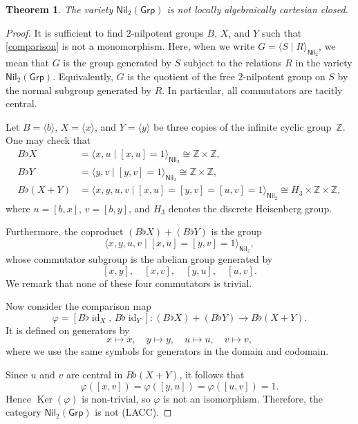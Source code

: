 \documentclass[reqno,hidelinks,a4paper]{amsart}
\theoremstyle{plain}
\newtheorem{theorem}[subsection]{Theorem}
\theoremstyle{definition}
\theoremstyle{remark}
\numberwithin{equation}{section}
\newcommand*{\CondName}[1]{{\rm (#1)}}
\newcommand*{\LACC}{\CondName{LACC}}
\newcommand{\Z}{\mathbb{Z}}
\DeclareMathOperator{\Ker}{Ker}
\DeclareMathOperator{\id}{id}
\newcommand{\Grp}{\ensuremath{\mathsf{Grp}}}
\newcommand{\Nil}{\ensuremath{\mathsf{Nil}}}
\begin{document}
\begin{theorem}
    The variety \(\Nil_2(\Grp)\) is not locally algebraically cartesian closed.
\end{theorem}

\begin{proof}
    It is sufficient to find \(2\)-nilpotent groups \(B\), \(X\), and \(Y\) such that \eqref{comparison} is not a monomorphism. Here, when we write \(G=\langle S \mid R \rangle_{\Nil_2}\), we mean that \(G\) is the group generated by \(S\)
    subject to the relations \(R\) in the variety \(\Nil_2(\Grp)\). Equivalently, \(G\) is the quotient of the free \(2\)-nilpotent group on \(S\) by the normal subgroup generated by \(R\). In
    particular, all commutators are tacitly central.

    Let \(B=\langle b\rangle\), \(X=\langle x\rangle\), and \(Y=\langle y\rangle\) be three copies of the infinite cyclic group~\(\Z\). One may check that
    \begin{align*}
        B \flat X     & = \langle x,u \mid [x,u]=1 \rangle_{\Nil_2} \cong \Z \times \Z,                           \\
        B \flat Y     & = \langle y,v \mid [y,v]=1 \rangle_{\Nil_2} \cong \Z \times \Z,                           \\
        B \flat (X+Y) & =\langle x,y,u,v \mid [x,u]=[y,v]=[u,v]=1 \rangle_{\Nil_2} \cong H_3 \times \Z \times \Z,
    \end{align*}
    where \(u=[b,x]\), \(v=[b,y]\), and \(H_3\) denotes the discrete Heisenberg group.

    Furthermore, the coproduct \((B \flat X) + (B \flat Y)\) is the group
    \[
        \langle x,y,u,v \mid [x,u]=[y,v]=1 \rangle_{\Nil_2},
    \]
    whose commutator subgroup is the abelian group generated by
    \[
        [x,y], \quad [x,v], \quad [y,u], \quad [u,v].
    \]
    We remark that none of these four commutators is trivial.

    Now consider the comparison map
    \[
        \varphi=[B \flat \id_X,\, B \flat \id_Y]\colon (B\flat X)+(B\flat Y)\to B\flat(X+Y).
    \]
    It is defined on generators by
    \[
        x \mapsto x,\quad y \mapsto y,\quad u \mapsto u,\quad v \mapsto v,
    \]
    where we use the same symbols for generators in the domain and codomain.

    Since \(u\) and \(v\) are central in \(B\flat (X+Y)\), it follows that
    \[
        \varphi([x,v])=\varphi([y,u])=\varphi([u,v])=1.
    \]
    Hence \(\Ker(\varphi)\) is non-trivial, so \(\varphi\) is not an isomorphism. Therefore, the category \(\Nil_2(\Grp)\) is not \LACC{}.
\end{proof}
\end{document}
